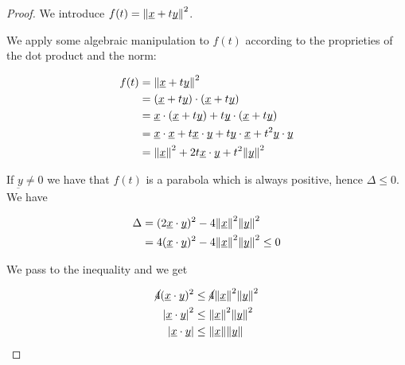 \documentclass[10pt]{extarticle}
\newcommand{\munderbar}[1]{\underbar{\ensuremath{#1}}}
\begin{document}
\begin{proof}
    We introduce $f(t) = \norm{\munderbar{x} + t \munderbar{y}}^2$.

    We apply some algebraic manipulation to $f(t)$ according to the proprieties of the dot product and the norm:

    \begin{align*}
        f(t) & = \norm{\munderbar{x} + t \munderbar{y}}^2                                                                                                              \\
             & = (\munderbar{x} + t \munderbar{y}) \cdot (\munderbar{x} + t \munderbar{y})                                                                             \\
             & = \munderbar{x} \cdot (\munderbar{x} + t \munderbar{y}) + t \munderbar{y} \cdot (\munderbar{x} + t \munderbar{y})                                       \\
             & = \munderbar{x} \cdot \munderbar{x} + t \munderbar{x} \cdot \munderbar{y} + t \munderbar{y} \cdot \munderbar{x} + t^2 \munderbar{y} \cdot \munderbar{y} \\
             & = \norm{\munderbar{x}}^2 + 2t \munderbar{x} \cdot \munderbar{y} + t^2 \norm{\munderbar{y}}^2
    \end{align*}

    If $\munderbar{y} \ne 0$ we have that $f(t)$ is a parabola which is always positive, hence $\Delta \leq 0$. We have

    \begin{align*}
        \Delta & = (2 \munderbar{x} \cdot \munderbar{y})^2 - 4 \norm{\munderbar{x}}^2 \norm{\munderbar{y}}^2        \\
               & = 4 (\munderbar{x} \cdot \munderbar{y})^2 - 4 \norm{\munderbar{x}}^2 \norm{\munderbar{y}}^2 \leq 0 \\
    \end{align*}

    We pass to the inequality and we get

    \begin{align*}
        \cancel{4}(\munderbar{x} \cdot \munderbar{y})^2 & \leq \cancel{4} \norm{\munderbar{x}}^2 \norm{\munderbar{y}}^2 \\
        \abs{\munderbar{x} \cdot \munderbar{y}} ^2      & \leq \norm{\munderbar{x}}^2 \norm{\munderbar{y}}^2            \\
        \abs{\munderbar{x} \cdot \munderbar{y}}         & \leq \norm{\munderbar{x}} \norm{\munderbar{y}}
    \end{align*}
\end{proof}
\end{document}
